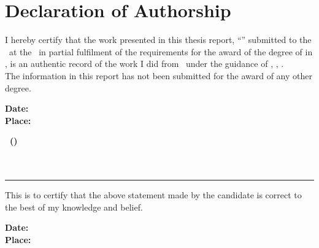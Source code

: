 
\chapter*{Declaration of Authorship}
\thispagestyle{plain}

I hereby certify that the work presented in this thesis report,
``\textbf{\ThesisTitle}'' submitted to the \Department\ at the \Institute\ in partial
fulfilment of the requirements for the award of the degree of
\textbf{\Degree} in \textbf{\Specialization},
is an authentic record of the work I did from \SubmissionPeriod\
under the guidance of \textbf{\SupervisorName},
\Department, \Institute.\\[0.2cm]
The information in this report has not been submitted for the award of
any other degree.

\vspace{1.5cm}

\noindent
\begin{minipage}[t]{0.35\textwidth}
\textbf{Date: \ThesisMonth\ \ThesisYear}\\[0.2cm]
\textbf{Place: \InstituteShort}
\end{minipage}
\hfill
\begin{minipage}[t]{0.40\textwidth}
\textbf{\AuthorName\ (\EnrolNo)}\\[0.1cm]
\Degree\\
\Department\\
\InstituteShort
\end{minipage}

\vspace{1.5cm}

\noindent\rule{\textwidth}{0.4pt}

\vspace{0.6cm}

This is to certify that the above statement made by the candidate is
correct to the best of my knowledge and belief.

\vspace{1.5cm}

\noindent
\begin{minipage}[t]{0.35\textwidth}
\textbf{Date: \ThesisMonth\ \ThesisYear}\\[0.2cm]
\textbf{Place: \InstituteShort}
\end{minipage}
\hfill
\begin{minipage}[t]{0.40\textwidth}
\textbf{\SupervisorName}\\[0.1cm]
\SupervisorDesignation\\
\Department\\
\InstituteShort
\end{minipage}
